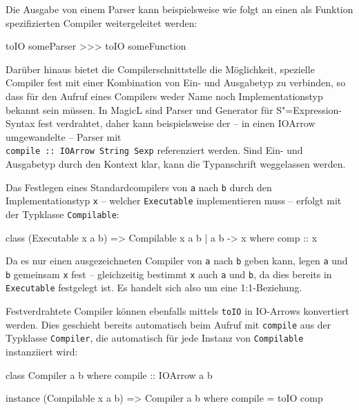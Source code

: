 \documentclass[12pt, a4paper, bibgerm]{scrbook}
\newenvironment{DIFnomarkup}{}{}
\newcommand\icode[1]{\lstinline?#1?}
\newcommand{\sexp}{S"=Expression}
\begin{document}
Die Ausgabe von einem Parser kann beispielsweise wie folgt an einen als
Funktion spezifizierten Compiler weitergeleitet werden:
\begin{code}
toIO someParser >>> toIO someFunction
\end{code}

Darüber hinaus bietet die Compilerschnittstelle die Möglichkeit,
spezielle Compiler fest mit einer Kombination von Ein- und Ausgabetyp zu
verbinden, so dass für den Aufruf eines Compilers weder Name noch
Implementationstyp bekannt sein müssen. In MagicL sind Parser und
Generator für \sexp{}-Syntax fest verdrahtet, daher kann beispielsweise
der -- in einen IOArrow umgewandelte -- Parser mit \\
\icode{compile :: IOArrow String Sexp} referenziert werden. Sind Ein-
und Ausgabetyp durch den Kontext klar, kann die Typanschrift weggelassen
werden.

Das Festlegen eines Standardcompilers von \icode{a} nach \icode{b} durch
den Implementationstyp \icode{x} -- welcher \icode{Executable}
implementieren muss -- erfolgt mit der Typklasse \icode{Compilable}:
\begin{DIFnomarkup}\begin{code}
class (Executable x a b) => Compilable x a b | a b -> x where
  comp :: x
\end{code}\end{DIFnomarkup}
Da es nur einen ausgezeichneten Compiler von \icode{a} nach \icode{b}
geben kann, legen \icode{a} und \icode{b} gemeinsam \icode{x} fest --
gleichzeitig bestimmt \icode{x} auch \icode{a} und \icode{b}, da dies
bereits in \icode{Executable} festgelegt ist. Es handelt sich also um
eine 1:1-Beziehung.

Festverdrahtete Compiler können ebenfalls mittels \icode{toIO} in
IO-Arrows konvertiert werden. Dies geschieht bereits automatisch beim
Aufruf mit \icode{compile} aus der Typklasse \icode{Compiler}, die
automatisch für jede Instanz von \icode{Compilable} instanziiert wird:
\begin{DIFnomarkup}\begin{code}
class Compiler a b where
  compile :: IOArrow a b

instance (Compilable x a b) => Compiler a b where
  compile = toIO comp
\end{code}\end{DIFnomarkup}
\end{document}
